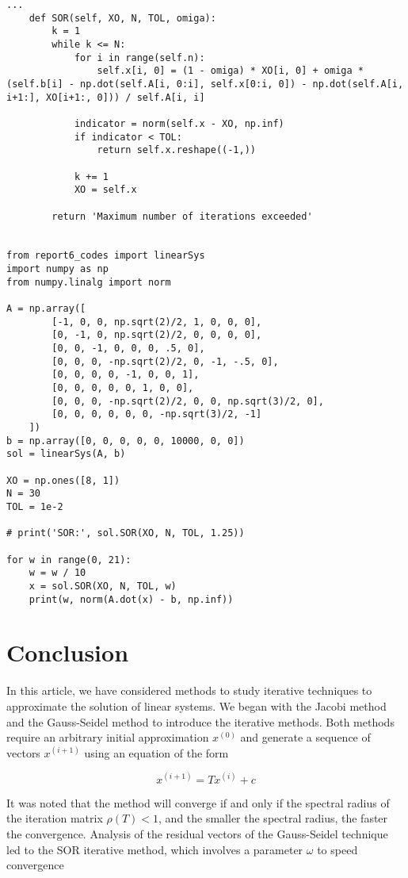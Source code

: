 \documentclass[preprint,12pt]{elsarticle}
\begin{document}
\begin{lstlisting}
...
    def SOR(self, XO, N, TOL, omiga):
        k = 1
        while k <= N:
            for i in range(self.n):
                self.x[i, 0] = (1 - omiga) * XO[i, 0] + omiga * (self.b[i] - np.dot(self.A[i, 0:i], self.x[0:i, 0]) - np.dot(self.A[i, i+1:], XO[i+1:, 0])) / self.A[i, i]
            
            indicator = norm(self.x - XO, np.inf)
            if indicator < TOL:
                return self.x.reshape((-1,))
            
            k += 1
            XO = self.x
        
        return 'Maximum number of iterations exceeded'


from report6_codes import linearSys
import numpy as np
from numpy.linalg import norm

A = np.array([
        [-1, 0, 0, np.sqrt(2)/2, 1, 0, 0, 0], 
        [0, -1, 0, np.sqrt(2)/2, 0, 0, 0, 0],
        [0, 0, -1, 0, 0, 0, .5, 0],
        [0, 0, 0, -np.sqrt(2)/2, 0, -1, -.5, 0],
        [0, 0, 0, 0, -1, 0, 0, 1],
        [0, 0, 0, 0, 0, 1, 0, 0],
        [0, 0, 0, -np.sqrt(2)/2, 0, 0, np.sqrt(3)/2, 0],
        [0, 0, 0, 0, 0, 0, -np.sqrt(3)/2, -1]
    ])
b = np.array([0, 0, 0, 0, 0, 10000, 0, 0])
sol = linearSys(A, b)

XO = np.ones([8, 1])
N = 30
TOL = 1e-2

# print('SOR:', sol.SOR(XO, N, TOL, 1.25))

for w in range(0, 21):
    w = w / 10
    x = sol.SOR(XO, N, TOL, w)
    print(w, norm(A.dot(x) - b, np.inf))
\end{lstlisting}

\section{Conclusion}
\label{S:4}

In this article, we have considered methods to study iterative techniques to approximate the solution of linear systems. We began with the Jacobi method and the Gauss-Seidel method to introduce the iterative methods. Both methods require an arbitrary initial approximation $x^{(0)}$ and generate a sequence of vectors $x^{(i+1)}$ using an equation of the form

\begin{equation}
  x^{(i+1)} = Tx^{(i)} + c
\end{equation}

It was noted that the method will converge if and only if the spectral radius of the iteration matrix $\rho(T)<1$, and the smaller the spectral radius, the faster the convergence. Analysis of the residual vectors of the Gauss-Seidel technique led to the SOR iterative method, which involves a parameter $\omega$ to speed convergence
\end{document}
